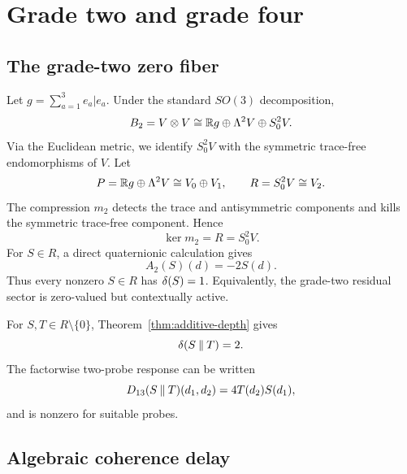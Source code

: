 \section{Grade two and grade four}\label{sec:grade-four}

\subsection{The grade-two zero fiber}

Let $g=\sum_{a=1}^3 e_a|e_a$.  Under the standard $SO(3)$ decomposition,
\begin{equation}\label{eq:b2-decomp}
  B_2=V\otimes V
  \cong \mathbb R g\oplus\Lambda^2V\oplus S^2_0V.
\end{equation}
Via the Euclidean metric, we identify $S^2_0V$ with the symmetric trace-free endomorphisms of $V$.
Let
\[
  P=\mathbb R g\oplus\Lambda^2V\cong V_0\oplus V_1,
  \qquad
  R=S^2_0V\cong V_2.
\]
The compression $m_2$ detects the trace and antisymmetric components and kills the symmetric trace-free component.  Hence
\begin{equation}\label{eq:grade-two-kernel}
  \ker m_2=R=S^2_0V.
\end{equation}
For $S\in R$, a direct quaternionic calculation gives
\begin{equation}\label{eq:grade-two-response}
  A_2(S)(d)=-2S(d).
\end{equation}
Thus every nonzero $S\in R$ has $\delta(S)=1$.  Equivalently, the grade-two residual sector is zero-valued but contextually active.

For $S,T\in R\setminus\{0\}$, Theorem~\ref{thm:additive-depth} gives
\begin{equation}\label{eq:pure-residual-depth}
  \delta(S\mathbin{\Vert} T)=2.
\end{equation}
The factorwise two-probe response can be written
\begin{equation}\label{eq:D13}
  D_{13}(S\mathbin{\Vert} T)(d_1,d_2)=4T(d_2)S(d_1),
\end{equation}
and is nonzero for suitable probes.

\subsection{Algebraic coherence delay}

